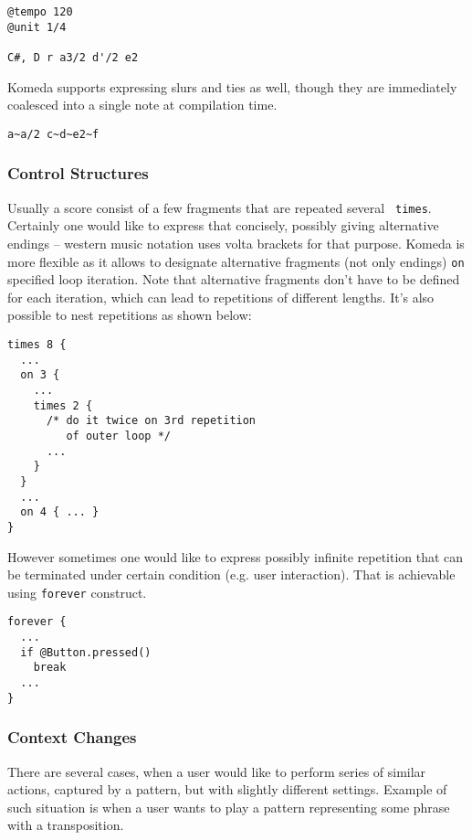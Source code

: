 \documentclass{article}
\begin{document}
\begin{lstlisting}[caption=Sample music score]
@tempo 120
@unit 1/4

C#, D r a3/2 d'/2 e2
\end{lstlisting}

Komeda supports expressing slurs and ties as well, though they are immediately
coalesced into a single note at compilation time.

\begin{lstlisting}[caption=Expressing slurs]
a~a/2 c~d~e2~f
\end{lstlisting}

\subsubsection{Control Structures}
Usually a score consist of a few fragments that are repeated several {\tt
  times}. Certainly one would like to express that concisely, possibly giving
alternative endings -- western music notation uses volta brackets for that
purpose.  Komeda is more flexible as it allows to designate alternative
fragments (not only endings) {\tt on} specified loop iteration. Note that
alternative fragments don't have to be defined for each iteration, which can
lead to repetitions of different lengths. It's also possible to nest
repetitions as shown below:

\begin{lstlisting}[caption=Nested loops and alternatives]
times 8 {
  ...
  on 3 {
    ...
    times 2 {
      /* do it twice on 3rd repetition
         of outer loop */
      ...
    }
  }
  ... 
  on 4 { ... }
}
\end{lstlisting}

However sometimes one would like to express possibly infinite repetition that
can be terminated under certain condition (e.g. user interaction). That is
achievable using {\tt forever} construct.

\begin{lstlisting}[caption=Infinite loop with break on user action]
forever {
  ...
  if @Button.pressed()
    break
  ...
}
\end{lstlisting}

\subsubsection{Context Changes}

There are several cases, when a user would like to perform series of similar
actions, captured by a pattern, but with slightly different settings. Example
of such situation is when a user wants to play a pattern representing some
phrase with a transposition.
\end{document}
